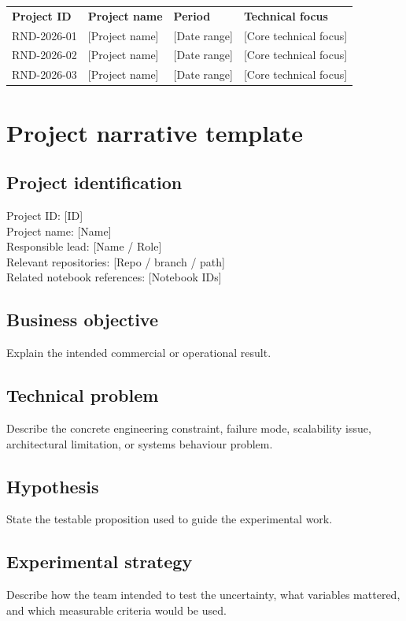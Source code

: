 \documentclass[11pt]{article}
\begin{document}
\begin{xltabular}{\textwidth}{L{2.7cm}L{4.5cm}L{2.8cm}Y}
\textbf{Project ID} & \textbf{Project name} & \textbf{Period} & \textbf{Technical focus} \\
RND-2026-01 & {[Project name]} & {[Date range]} & {[Core technical focus]} \\
RND-2026-02 & {[Project name]} & {[Date range]} & {[Core technical focus]} \\
RND-2026-03 & {[Project name]} & {[Date range]} & {[Core technical focus]} \\
\end{xltabular}

\section{Project narrative template}
\subsection{Project identification}
Project ID: {[ID]}\\
Project name: {[Name]}\\
Responsible lead: {[Name / Role]}\\
Relevant repositories: {[Repo / branch / path]}\\
Related notebook references: {[Notebook IDs]}

\subsection{Business objective}
Explain the intended commercial or operational result.

\subsection{Technical problem}
\RaggedRight
Describe the concrete engineering constraint, failure mode, scalability issue, architectural limitation, or systems behaviour problem.\par
\justifying

\subsection{Hypothesis}
State the testable proposition used to guide the experimental work.

\subsection{Experimental strategy}
Describe how the team intended to test the uncertainty, what variables mattered, and which measurable criteria would be used.
\end{document}
